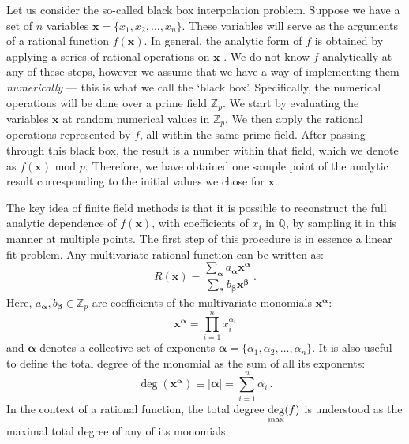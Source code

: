 \documentclass[main.tex]{subfiles}
\begin{document}
Let us consider the so-called black box interpolation problem. Suppose we have a set of $n$ variables $\mathbf{x}=\{x_1, x_2, \ldots, x_n\}$. These variables will serve as the arguments of a rational function $f(\mathbf{x})$. In general, the analytic form of $f$ is obtained by applying a series of rational operations on $\mathbf{x}$ . We do not know $f$ analytically at any of these steps, however we assume that we have a way of implementing them \textit{numerically} --- this is what we call the `black box'. Specifically, the numerical operations will be done over a prime field $\mathbb{Z}_p$. We start by evaluating the variables $\mathbf{x}$ at random numerical values in $\mathbb{Z}_p$. We then apply the rational operations represented by $f$, all within the same prime field. After passing through this black box, the result is a number within that field, which we denote as $f(\mathbf{x}) \text{ mod } p$. Therefore, we have obtained one sample point of the analytic result corresponding to the initial values we chose for $\mathbf{x}$.

The key idea of finite field methods is that it is possible to reconstruct the full analytic dependence of $f(\mathbf{x})$, with coefficients of $x_i$ in $\mathbb{Q}$, by sampling it in this manner at multiple points. The first step of this procedure is in essence a linear fit problem. Any multivariate rational function can be written as:
\begin{equation} \label{eq:ratfun}
     R(\mathbf{x}) = \frac{
     \sum_{\bm{\alpha}} a_{\bm{\alpha}} \mathbf{x}^{\bm{\alpha}}
     }{
     \sum_{\bm{\beta}} b_{\bm{\beta}} \mathbf{x}^{\bm{\beta}}
     }\,.
\end{equation}
Here, $a_{\bm{\alpha}}, b_{\bm{\beta}} \in \mathbb{Z}_p$ are coefficients of the multivariate monomials $\mathbf{x}^{\bm{\alpha}}$:
\begin{equation}
    \mathbf{x}^{\bm{\alpha}} = \prod_{i=1}^n x_i^{\alpha_i}
\end{equation}
and $\bm{\alpha}$ denotes a collective set of exponents $\bm{\alpha} = \{\alpha_1, \alpha_2, \ldots, \alpha_n\}$. It is also useful to define the total degree of the monomial as the sum of all its exponents:
\begin{equation}
    \deg (\mathbf{x}^{\bm{\alpha}}) \equiv |\bm{\alpha}| = \sum_{i=1}^n \alpha_i\,.
\end{equation}
In the context of a rational function, the total degree $\underset{\text{max}}{\deg}(f)$ is understood as the maximal total degree of any of its monomials.
\end{document}
